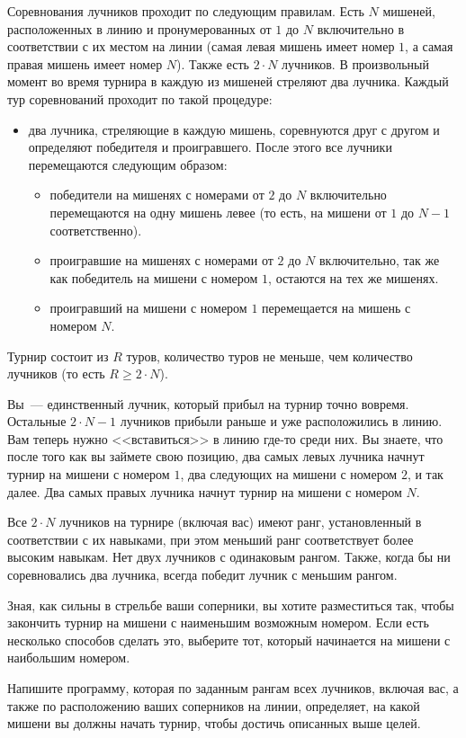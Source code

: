 Соревнования лучников проходит по следующим правилам. Есть $N$ мишеней, расположенных в
линию и пронумерованных от $1$ до $N$ включительно в соответствии с их местом на линии (самая левая мишень имеет номер $1$, а самая правая мишень имеет номер $N$). Также есть $2 \cdot N$ лучников. В произвольный момент во время турнира в каждую из мишеней стреляют два лучника. Каждый тур соревнований проходит по такой процедуре:
\begin{itemize}
\item два лучника, стреляющие в каждую мишень, соревнуются друг с другом и определяют победителя и проигравшего. После этого все лучники перемещаются следующим образом:
\begin{itemize}
\item победители на мишенях с номерами от $2$ до $N$ включительно перемещаются на одну
мишень левее (то есть, на мишени от $1$ до $N - 1$ соответственно).
\item проигравшие на мишенях с номерами от $2$ до $N$ включительно, так же как победитель
на мишени с номером $1$, остаются на тех же мишенях.
\item проигравший на мишени с номером $1$ перемещается на мишень с номером $N$.
\end{itemize}
\end{itemize}

Турнир состоит из $R$ туров, количество туров не меньше, чем количество лучников (то есть $R \ge 2 \cdot N$).

Вы~--- единственный лучник, который прибыл на турнир точно вовремя. Остальные $2 \cdot N - 1$ лучников прибыли раньше и уже расположились в линию. Вам теперь нужно <<вставиться>> в линию где-то среди них. Вы знаете, что после того как вы займете свою позицию, два самых левых лучника начнут турнир на мишени с номером $1$, два следующих на мишени с номером $2$, и так далее. Два самых правых лучника начнут турнир на мишени с номером $N$.

Все $2 \cdot N$ лучников на турнире (включая вас) имеют ранг, установленный в соответствии с их навыками, при этом меньший ранг соответствует более высоким навыкам. Нет двух лучников с одинаковым рангом. Также, когда бы ни соревновались два лучника, всегда победит лучник с меньшим рангом.

Зная, как сильны в стрельбе ваши соперники, вы хотите разместиться так, чтобы закончить турнир на мишени с наименьшим возможным номером. Если есть несколько способов сделать это, выберите тот, который начинается на мишени с наибольшим номером.

Напишите программу, которая по заданным рангам всех лучников, включая вас, а также по
расположению ваших соперников на линии, определяет, на какой мишени вы должны начать
турнир, чтобы достичь описанных выше целей.